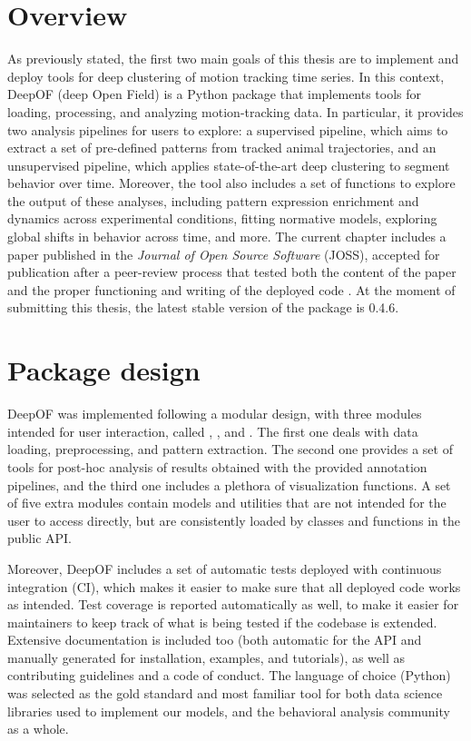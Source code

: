 \section{Overview}

As previously stated, the first two main goals of this thesis are to implement and deploy tools for deep clustering of motion tracking time series. In this context, DeepOF (deep Open Field) is a Python package that implements tools for loading, processing, and analyzing motion-tracking data. In particular, it provides two analysis pipelines for users to explore: a supervised pipeline, which aims to extract a set of pre-defined patterns from tracked animal trajectories, and an unsupervised pipeline, which applies state-of-the-art deep clustering to segment behavior over time. Moreover, the tool also includes a set of functions to explore the output of these analyses, including pattern expression enrichment and dynamics across experimental conditions, fitting normative models, exploring global shifts in behavior across time, and more. The current chapter includes a paper published in the \emph{Journal of Open Source Software} (JOSS), accepted for publication after a peer-review process that tested both the content of the paper and the proper functioning and writing of the deployed code \cite{Miranda2023DeepOF:Data}. At the moment of submitting this thesis, the latest stable version of the package is 0.4.6.

\section{Package design}

DeepOF was implemented following a modular design, with three modules intended for user interaction, called , , and . The first one deals with data loading, preprocessing, and pattern extraction. The second one provides a set of tools for post-hoc analysis of results obtained with the provided annotation pipelines, and the third one includes a plethora of visualization functions. A set of five extra modules contain models and utilities that are not intended for the user to access directly, but are consistently loaded by classes and functions in the public API.

Moreover, DeepOF includes a set of automatic tests deployed with continuous integration (CI), which makes it easier to make sure that all deployed code works as intended. Test coverage is reported automatically as well, to make it easier for maintainers to keep track of what is being tested if the codebase is extended. Extensive documentation is included too (both automatic for the API and manually generated for installation, examples, and tutorials), as well as contributing guidelines and a code of conduct. The language of choice (Python) was selected as the gold standard and most familiar tool for both data science libraries used to implement our models, and the behavioral analysis community as a whole.

